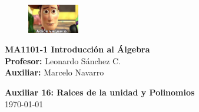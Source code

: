 \documentclass[letterpaper,10pt]{article}
\theoremstyle{plain}
\begin{document}
\newpage
\pagestyle{fancy}
\fancyhf{}

\begin{figure} %
    \vspace{-5mm}
    \includegraphics[width=0.2\textwidth]{img/vaquero.png}
\end{figure}


\noindent
\textbf{MA1101-1 Introducción al Álgebra}\\
\textbf{Profesor: }Leonardo Sánchez C.\\
\textbf{Auxiliar: }Marcelo Navarro

\begin{center}
{\bf \Large Auxiliar 16: Raices de la unidad y Polinomios}\\
{\today}
\end{center}
\end{document}
